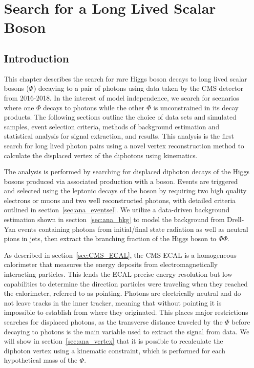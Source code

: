 
\chapter{Search for a Long Lived Scalar Boson}
\label{chap:ana}
\section{Introduction} \label{sec:ana_intro}
This chapter describes the search for rare Higgs boson decays to long lived scalar bosons ($\Phi$) decaying to a pair of photons using data taken by the CMS detector from 2016-2018. In the interest of model independence, we search for scenarios where one $\Phi$ decays to photons while the other $\Phi$ is unconstrained in its decay products. The following sections outline the choice of data sets and simulated samples, event selection criteria, methods of background estimation and statistical analysis for signal extraction, and results. This analysis is the first search for long lived photon pairs using a novel vertex reconstruction method to calculate the displaced vertex of the diphotons using kinematics.

The analysis is performed by searching for displaced diphoton decays of the Higgs bosons produced via associated production with a \PZ boson. Events are triggered and selected using the leptonic decays of the \PZ boson by requiring two high quality electrons or muons and two well reconstructed photons, with detailed criteria outlined in section~\ref{sec:ana_eventsel}. We utilize a data-driven background estimation shown in section~\ref{sec:ana_bkg} to model the background from Drell-Yan events containing photons from initial/final state radiation as well as neutral pions in jets, then extract the branching fraction of the Higgs boson to $\Phi\Phi$.

As described in section~\ref{sec:CMS_ECAL}, the CMS ECAL is a homogeneous calorimeter that measures the energy deposits from electromagnetically interacting particles. This lends the ECAL precise energy resolution but low capabilities to determine the direction particles were traveling when they reached the calorimeter, referred to as pointing. Photons are electrically neutral and do not leave tracks in the inner tracker, meaning that without pointing it is impossible to establish from where they originated. This places major restrictions searches for displaced photons, as the transverse distance traveled by the $\Phi$ before decaying to photons is the main variable used to extract the signal from data. We will show in section~\ref{sec:ana_vertex} that it is possible to recalculate the diphoton vertex using a kinematic constraint, which is performed for each hypothetical mass of the $\Phi$.

